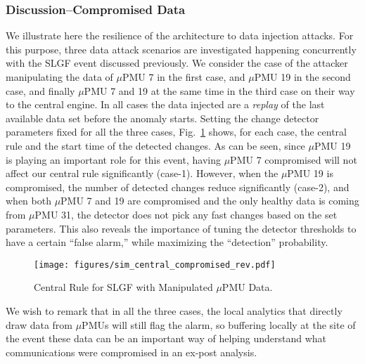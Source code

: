 \documentclass[twocolumn]{IEEEtran}
\newcommand{\mup}{\mu \text{PMU}}
\begin{document}
\subsubsection{Discussion--Compromised Data} 
We illustrate here the resilience of the architecture to data injection attacks. 
For this purpose, three data attack scenarios are investigated happening concurrently with the SLGF event discussed previously. We consider the case of the attacker manipulating the data of $\mup$ 7 in the first case, and $\mup$ 19 in the second case, and finally $\mup$ 7 and 19 at the same time in the third case on their way to the central engine. In all cases the data injected are a {\it replay} of the last available data set before the anomaly starts. Setting the change detector parameters fixed for all the three cases, Fig.~\ref{fig.sim_central_compromised} shows, for each case, the central rule and the start time of the detected changes. As can be seen, since $\mup$ 19 is playing an important role for this event, having $\mup$ 7 compromised will not affect our central rule significantly (case-1). However, when the $\mup$ 19 is compromised, the number of detected changes reduce significantly (case-2), and when both $\mup$ 7 and 19 are compromised and the only healthy data is coming from $\mup$ 31, the detector does not pick any fast changes based on the set parameters. This also reveals the importance of tuning the detector thresholds to have a certain ``false alarm,'' while maximizing the ``detection'' probability.   
\begin{figure}[ht]
\centering 
\texttt{[image: figures/sim\_central\_compromised\_rev.pdf]}
\caption{Central Rule for SLGF with Manipulated $\mup$ Data.}
\label{fig.sim_central_compromised}
\end{figure}          
We wish to remark that in all the three cases, the local analytics that directly draw data from $\mup$s will still flag the alarm, so buffering locally at the site of the event these data can be an important way of helping understand what communications were compromised in an ex-post analysis.
\end{document}
